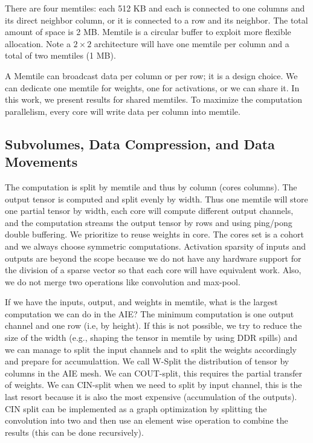 \documentclass{IEEEtran}
\begin{document}
There are four memtiles: each 512 KB and each is connected to one
columns and its direct neighbor column, or it is connected to a row
and its neighbor. The total amount of space is 2 MB. Memtile is a
circular buffer to exploit more flexible allocation. Note a $2 \times
2$ architecture will have one memtile per column and a total of two
memtiles (1 MB).

A Memtile can broadcast data per column or per row; it is a design
choice. We can dedicate one memtile for weights, one for activations,
or we can share it. In this work, we present results for shared
memtiles. To maximize the computation parallelism, every core will
write data per column into memtile.


\subsection{Subvolumes, Data Compression, and Data Movements}
The computation is split by memtile and thus by column (cores
columns). The output tensor is computed and split evenly by
width. Thus one memtile will store one partial tensor by width, each
core will compute different output channels, and the computation
streams the output tensor by rows and using ping/pong double
buffering. We prioritize to reuse weights in core. The cores set is a
cohort and we always choose symmetric computations. Activation
sparsity of inputs and outputs are beyond the scope because we do not
have any hardware support for the division of a sparse vector so that
each core will have equivalent work. Also, we do not merge two
operations like convolution and max-pool.

If we have the inputs, output, and weights in memtile, what is the
largest computation we can do in the AIE? The minimum computation is
one output channel and one row (i.e, by height). If this is not
possible, we try to reduce the size of the width (e.g., shaping the
tensor in memtile by using DDR spills) and we can manage to split the
input channels and to split the weights accordingly and prepare for
accumulattion. We call W-Split the distribution of tensor by columns
in the AIE mesh. We can COUT-split, this requires the partial transfer
of weights.  We can CIN-split when we need to split by input channel,
this is the last resort because it is also the most expensive
(accumulation of the outputs). CIN split can be implemented as a graph
optimization by splitting the convolution into two and then use an
element wise operation to combine the results (this can be done
recursively).
\end{document}
